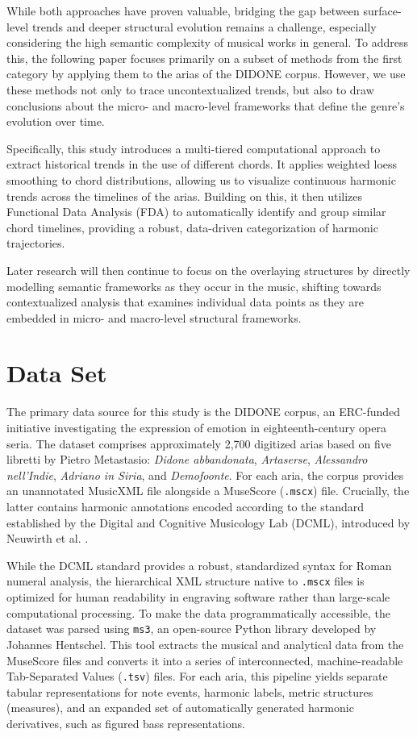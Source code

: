\documentclass[10pt,a4paper,twocolumn]{article}
\begin{document}
While both approaches have proven valuable, bridging the gap between surface-level trends and deeper structural evolution remains a challenge, especially considering the high semantic complexity of musical works in general. To address this, the following paper focuses primarily on a subset of methods from the first category by applying them to the arias of the DIDONE corpus. However, we use these methods not only to trace uncontextualized trends, but also to draw conclusions about the micro- and macro-level frameworks that define the genre's evolution over time.

Specifically, this study introduces a multi-tiered computational approach to extract historical trends in the use of different chords. It applies weighted loess smoothing to chord distributions, allowing us to visualize continuous harmonic trends across the timelines of the arias. Building on this, it then utilizes Functional Data Analysis (FDA) to automatically identify and group similar chord timelines, providing a robust, data-driven categorization of harmonic trajectories.

Later research will then continue to focus on the overlaying structures by directly modelling semantic frameworks as they occur in the music, shifting towards contextualized analysis that examines individual data points as they are embedded in micro- and macro-level structural frameworks.

\section{Data Set}\label{sec:dataset}
The primary data source for this study is the DIDONE corpus, an ERC-funded initiative investigating the expression of emotion in eighteenth-century opera seria. The dataset comprises approximately 2,700 digitized arias based on five libretti by Pietro Metastasio: \textit{Didone abbandonata}, \textit{Artaserse}, \textit{Alessandro nell’Indie}, \textit{Adriano in Siria}, and \textit{Demofoonte}. For each aria, the corpus provides an unannotated MusicXML file alongside a MuseScore (\texttt{.mscx}) file. Crucially, the latter contains harmonic annotations encoded according to the standard established by the Digital and Cognitive Musicology Lab (DCML), introduced by Neuwirth et al. \cite{neuwirthAnnotatedBeethovenCorpus2018b}.

While the DCML standard provides a robust, standardized syntax for Roman numeral analysis, the hierarchical XML structure native to \texttt{.mscx} files is optimized for human readability in engraving software rather than large-scale computational processing. To make the data programmatically accessible, the dataset was parsed using \texttt{ms3}, an open-source Python library developed by Johannes Hentschel. This tool extracts the musical and analytical data from the MuseScore files and converts it into a series of interconnected, machine-readable Tab-Separated Values (\texttt{.tsv}) files. For each aria, this pipeline yields separate tabular representations for note events, harmonic labels, metric structures (measures), and an expanded set of automatically generated harmonic derivatives, such as figured bass representations.
\end{document}
